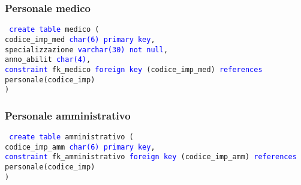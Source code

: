 \documentclass{article}
\begin{document}
    \subsubsection{Personale medico}
    \begin{flushleft}
        \texttt{
        \textcolor{blue}{create table} medico ( \\
        \hspace*{2em} codice\_imp\_med \hspace*{2.9em} \textcolor{blue}{char(6)} \hspace*{5.5em} \textcolor{blue}{primary key}, \\
        \hspace*{2em} specializzazione \hspace*{1.6em} \textcolor{blue}{varchar(30)} \hspace*{3.5em} \textcolor{blue}{not null}, \\
        \hspace*{2em} anno\_abilit \hspace*{4.2em} \textcolor{blue}{char(4)}, \\
        \hspace*{2em} \textcolor{blue}{constraint} fk\_medico \textcolor{blue}{foreign key} (codice\_imp\_med) \textcolor{blue}{references} \hspace*{2em} personale(codice\_imp) \\)}
    \end{flushleft}

    \subsubsection{Personale amministrativo}
    \begin{flushleft}
        \texttt{
        \textcolor{blue}{create table} amministrativo ( \\
        \hspace*{2em} codice\_imp\_amm \hspace*{2em} \textcolor{blue}{char(6)} \hspace*{1.2em} \textcolor{blue}{primary key}, \\
        \hspace*{2em} \textcolor{blue}{constraint} fk\_amministrativo \textcolor{blue}{foreign key} (codice\_imp\_amm) \textcolor{blue}{references} \hspace*{2em} personale(codice\_imp) \\)}
    \end{flushleft}
\end{document}

